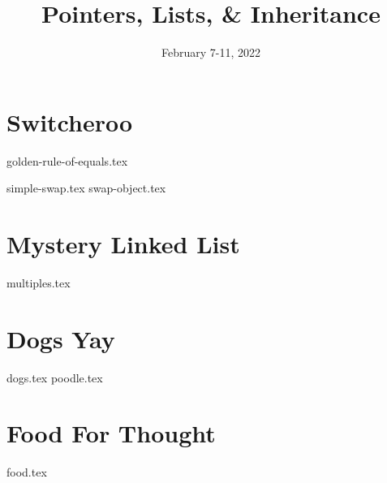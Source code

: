 \documentclass[11pt]{exam}
\title{Pointers, Lists, \& Inheritance}
\date{February 7-11, 2022}
\begin{document}
\maketitle

\section{Switcheroo}
{golden-rule-of-equals.tex}
\begin{questions}
{simple-swap.tex}
{swap-object.tex}
\end{questions}

\clearpage

\section{Mystery Linked List}
\begin{questions}
{multiples.tex}
\end{questions}

\clearpage

\section{Dogs Yay}
\begin{questions}
{dogs.tex}
{poodle.tex}
\end{questions}

\clearpage

\section{Food For Thought}

\begin{questions}



{food.tex}
\end{questions}
\end{document}
